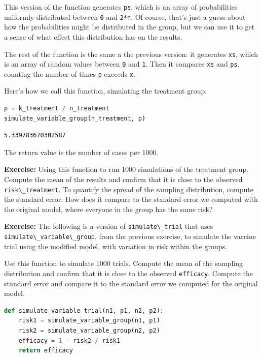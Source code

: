 This version of the function generates \passthrough{\lstinline!ps!},
which is an array of probabilities uniformly distributed between
\passthrough{\lstinline!0!} and \passthrough{\lstinline!2*n!}. Of
course, that's just a guess about how the probabilities might be
distributed in the group, but we can use it to get a sense of what
effect this distribution has on the results.

The rest of the function is the same a the previous version: it
generates \passthrough{\lstinline!xs!}, which is an array of random
values between \passthrough{\lstinline!0!} and
\passthrough{\lstinline!1!}. Then it compares
\passthrough{\lstinline!xs!} and \passthrough{\lstinline!ps!}, counting
the number of times \passthrough{\lstinline!p!} exceeds
\passthrough{\lstinline!x!}.

Here's how we call this function, simulating the treatment group.

\begin{lstlisting}[language=Python,style=source]
p = k_treatment / n_treatment
simulate_variable_group(n_treatment, p)
\end{lstlisting}

\begin{lstlisting}[style=output]
5.339783670302587
\end{lstlisting}

The return value is the number of cases per 1000.

\textbf{Exercise:} Using this function to run 1000 simulations of the
treatment group. Compute the mean of the results and confirm that it is
close to the observed \passthrough{\lstinline!risk\_treatment!}. To
quantify the spread of the sampling distribution, compute the standard
error. How does it compare to the standard error we computed with the
original model, where everyone in the group has the same risk?

\textbf{Exercise:} The following is a version of
\passthrough{\lstinline!simulate\_trial!} that uses
\passthrough{\lstinline!simulate\_variable\_group!}, from the previous
exercise, to simulate the vaccine trial using the modified model, with
variation in risk within the groups.

Use this function to simulate 1000 trials. Compute the mean of the
sampling distribution and confirm that it is close to the observed
\passthrough{\lstinline!efficacy!}. Compute the standard error and
compare it to the standard error we computed for the original model.

\begin{lstlisting}[language=Python,style=source]
def simulate_variable_trial(n1, p1, n2, p2):
    risk1 = simulate_variable_group(n1, p1)
    risk2 = simulate_variable_group(n2, p2)
    efficacy = 1 - risk2 / risk1
    return efficacy
\end{lstlisting}

